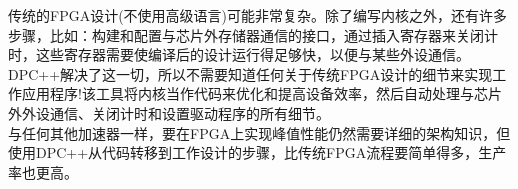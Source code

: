 \begin{tcolorbox}[colback=blue!5!white,colframe=blue!75!black, title=在FPGA上使用DPC++其实要经历很多!]
传统的FPGA设计(不使用高级语言)可能非常复杂。除了编写内核之外，还有许多步骤，比如：构建和配置与芯片外存储器通信的接口，通过插入寄存器来关闭计时，这些寄存器需要使编译后的设计运行得足够快，以便与某些外设通信。DPC++解决了这一切，所以不需要知道任何关于传统FPGA设计的细节来实现工作应用程序!该工具将内核当作代码来优化和提高设备效率，然后自动处理与芯片外外设通信、关闭计时和设置驱动程序的所有细节。\\

与任何其他加速器一样，要在FPGA上实现峰值性能仍然需要详细的架构知识，但使用DPC++从代码转移到工作设计的步骤，比传统FPGA流程要简单得多，生产率也更高。
\end{tcolorbox}



















